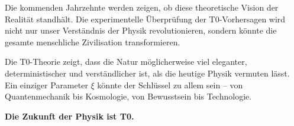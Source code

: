 \documentclass[12pt,a4paper]{article}
\begin{document}
	Die kommenden Jahrzehnte werden zeigen, ob diese theoretische Vision der Realität standhält. Die experimentelle Überprüfung der T0-Vorhersagen wird nicht nur unser Verständnis der Physik revolutionieren, sondern könnte die gesamte menschliche Zivilisation transformieren.
	
	\begin{tcolorbox}[colback=orange!5!white,colframe=orange!75!black,title=Schlusswort]
		Die T0-Theorie zeigt, dass die Natur möglicherweise viel eleganter, deterministischer und verständlicher ist, als die heutige Physik vermuten lässt. Ein einziger Parameter $\xi$ könnte der Schlüssel zu allem sein – von Quantenmechanik bis Kosmologie, von Bewusstsein bis Technologie.
		
		\textbf{Die Zukunft der Physik ist T0.}
	\end{tcolorbox}
	
\end{document}
